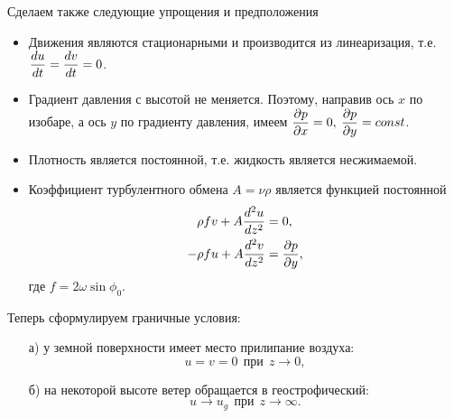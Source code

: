Сделаем также следующие упрощения и предположения
\begin{itemize}
    \item Движения являются стационарными и производится из линеаризация, т.е. $\displaystyle\frac{d u}{d t}=\displaystyle\frac{d v}{d t}=0$.
    \item Градиент давления с высотой не меняется. Поэтому, направив ось $x$ по изобаре, а ось $y$ по градиенту давления, имеем $\displaystyle\frac{\partial p}{\partial x}=0, \: \displaystyle\frac{\partial p}{\partial y}=const$.
    \item Плотность является постоянной, т.е. жидкость является несжимаемой.
    \item Коэффициент турбулентного обмена $A=\nu \rho$ является функцией постоянной
    \begin{align}
         \rho f v +A\displaystyle\frac{d ^2 u}{d z^2} &= 0, \label{eq:ch14-2_1} \\
        -\rho f u +A\displaystyle\frac{d ^2 v}{d z^2} &= \displaystyle\frac{\partial p}{\partial y}, \label{eq:ch14-2_2} 
    \end{align}
    где $f=2\omega\sin{\phi_0}$. 
\end{itemize}
Теперь сформулируем граничные условия:
\begin{itemize}
    \item[а)] у земной поверхности имеет место прилипание воздуха: 
        \begin{equation}
            \label{eq:ch14-2_3}
            u=v=0 \:\: \textrm{при} \:\: z\rightarrow0,
        \end{equation}
    \item[б)] на некоторой высоте ветер обращается в геострофический:
    \begin{equation}
            \label{eq:ch14-2_4}
            u\rightarrow u_g \:\: \textrm{при} \:\: z\rightarrow\infty.
        \end{equation}
\end{itemize}

